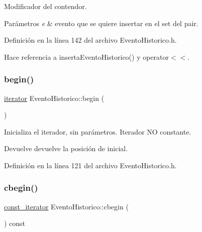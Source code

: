 Modificador del contendor. 


\begin{DoxyParams}{Parámetros}
{\em e} & evento que se quiere insertar en el set del pair. \\
\hline
\end{DoxyParams}


Definición en la línea 142 del archivo Evento\+Historico.\+h.



Hace referencia a inserta\+Evento\+Historico() y operator$<$$<$.

\hypertarget{classEventoHistorico_a8f27947006df390ef03eab962029e14b}{}\label{classEventoHistorico_a8f27947006df390ef03eab962029e14b} 
\subsubsection{\texorpdfstring{begin()}{begin()}}
{\footnotesize\ttfamily \hyperlink{classEventoHistorico_1_1iterator}{iterator} Evento\+Historico\+::begin (\begin{DoxyParamCaption}{ }\end{DoxyParamCaption})\hspace{0.3cm}{\ttfamily [inline]}}



Inicializa el iterador, sin parámetros. Iterador NO constante. 

\begin{DoxyReturn}{Devuelve}
devuelve la posición de inicial. 
\end{DoxyReturn}


Definición en la línea 121 del archivo Evento\+Historico.\+h.

\hypertarget{classEventoHistorico_a78a3ad0944311039c814e0b212e68929}{}\label{classEventoHistorico_a78a3ad0944311039c814e0b212e68929} 
\subsubsection{\texorpdfstring{cbegin()}{cbegin()}}
{\footnotesize\ttfamily \hyperlink{classEventoHistorico_1_1const__iterator}{const\+\_\+iterator} Evento\+Historico\+::cbegin (\begin{DoxyParamCaption}{ }\end{DoxyParamCaption}) const\hspace{0.3cm}{\ttfamily [inline]}}



